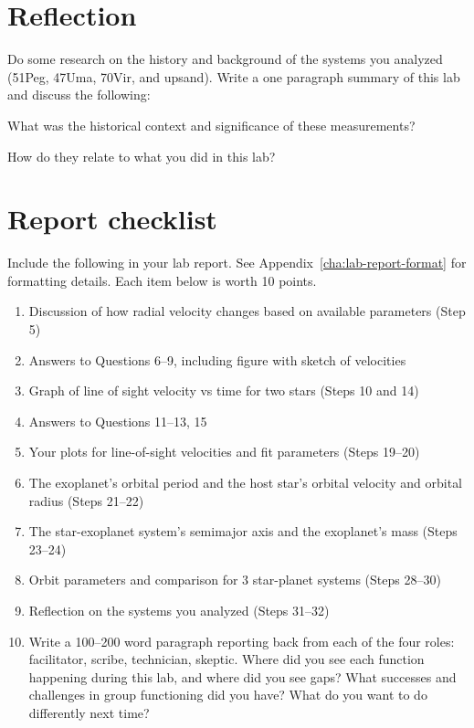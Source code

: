 \section{Reflection}

Do some research on the history and background of the systems you analyzed (51Peg, 47Uma, 70Vir, and upsand). Write a one paragraph summary of this lab and discuss the following:

\begin{steps}
	\item What was the historical context and significance of these measurements?
	
	\item How do they relate to what you did in this lab?
\end{steps}

\section{Report checklist}

Include the following in your lab report. See Appendix~\ref{cha:lab-report-format} for formatting details. Each item below is worth 10 points.

\begin{enumerate}
	\item Discussion of how radial velocity changes based on available parameters (Step 5)
	\item Answers to Questions 6--9, including figure with sketch of velocities
	\item Graph of line of sight velocity vs time for two stars (Steps 10 and 14)
	\item Answers to Questions 11--13, 15
	\item Your plots for line-of-sight velocities and fit parameters (Steps 19--20)
	\item The exoplanet's orbital period and the host star's orbital velocity and orbital radius (Steps 21--22)
	\item The star-exoplanet system's semimajor axis and the exoplanet's mass (Steps 23--24)
	\item Orbit parameters and comparison for 3 star-planet systems (Steps 28--30)
	\item Reflection on the systems you analyzed (Steps 31--32)
	\item Write a 100--200 word paragraph reporting back from each of the four roles: facilitator, scribe, technician, skeptic. Where did you see each function happening during this lab, and where did you see gaps? What successes and challenges in group functioning did you have? What do you want to do differently next time?
\end{enumerate}